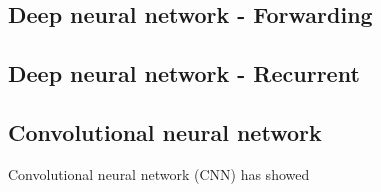 \subsection{Deep neural network - Forwarding}
\subsection{Deep neural network - Recurrent}
\subsection{Convolutional neural network}
Convolutional neural network (CNN) has showed 